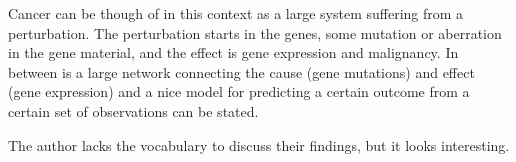 \documentclass[12p]{article}
\begin{document}
Cancer can be though of in this context as a large system suffering from a perturbation.
The perturbation starts in the genes, some mutation or aberration in the gene material, and the effect is gene expression and malignancy.
In between is a large network connecting the cause (gene mutations) and effect (gene expression) and a nice model for predicting a certain outcome from a certain set of observations can be stated.

The author lacks the vocabulary to discuss their findings, but it looks interesting.






%
%
%
%
%
\end{document}
